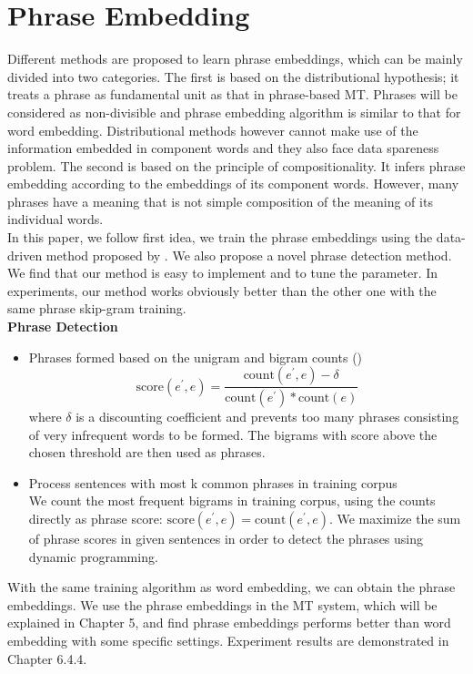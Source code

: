 \section{Phrase Embedding}
Different methods are proposed to learn phrase embeddings, which can be mainly divided into two categories. The first is based on the distributional hypothesis; it treats a phrase as fundamental unit as that in phrase-based MT. Phrases will be considered as non-divisible and phrase embedding algorithm is similar to that for word embedding. Distributional methods however cannot make use of the information embedded in component words and they also face data spareness problem. The second is based on the principle of compositionality. It infers phrase embedding according to the embeddings of its component words. However,  many phrases have a meaning that is not simple composition of the meaning of its individual words. \\
In this paper, we follow first idea, we train the phrase embeddings using the data-driven method proposed by \cite{mikolov2013distributed}. We also propose a novel phrase detection method. We find that our method is easy to implement and to tune the parameter. In experiments, our method works obviously better than the other one with the same phrase skip-gram training.\\

\textbf{Phrase Detection}
\begin{itemize}
	\item Phrases formed based on the unigram and bigram counts (\cite{mikolov2013distributed})\\
	\[\text{score}(e^{\prime}, e) = \frac{\text{count}(e^{\prime}, e)-\delta}{\text{count}(e^{\prime}) * \text{count}(e)} \]
	where $\delta$ is a discounting coefficient and prevents too many phrases consisting of very infrequent words to be formed. The bigrams with score above the chosen threshold are then used as
	phrases. 
	\item Process sentences with most k common phrases in training corpus\\
	We count the most frequent bigrams in training corpus, using the counts directly as phrase score: $\text{score}(e^{\prime}, e) = \text{count}(e^{\prime}, e)$. We maximize the sum of phrase scores in given sentences in order to detect the phrases using dynamic programming. 
\end{itemize}

With the same training algorithm as word embedding, we can obtain the phrase embeddings. We use the phrase embeddings in the MT system, which will be explained in Chapter 5, and find phrase embeddings performs better than word embedding with some specific settings. Experiment results are demonstrated in Chapter 6.4.4.